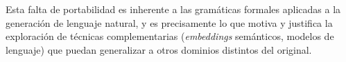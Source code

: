 Esta falta de portabilidad es inherente a las gramáticas formales aplicadas a la generación de lenguaje natural, y es precisamente lo que motiva y justifica la exploración de técnicas complementarias (\textit{embeddings} semánticos, modelos de lenguaje) que puedan generalizar a otros dominios distintos del original.

